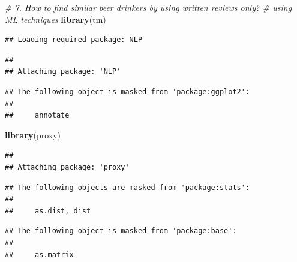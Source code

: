 \documentclass[
  a4paper,
]{article}
\newenvironment{Shaded}{\begin{snugshade}}{\end{snugshade}}
\newcommand{\AttributeTok}[1]{\textcolor[rgb]{0.13,0.29,0.53}{#1}}
\newcommand{\CommentTok}[1]{\textcolor[rgb]{0.56,0.35,0.01}{\textit{#1}}}
\newcommand{\ConstantTok}[1]{\textcolor[rgb]{0.56,0.35,0.01}{#1}}
\newcommand{\ControlFlowTok}[1]{\textcolor[rgb]{0.13,0.29,0.53}{\textbf{#1}}}
\newcommand{\FunctionTok}[1]{\textcolor[rgb]{0.13,0.29,0.53}{\textbf{#1}}}
\newcommand{\NormalTok}[1]{#1}
\newcommand{\OtherTok}[1]{\textcolor[rgb]{0.56,0.35,0.01}{#1}}
\newcommand{\SpecialCharTok}[1]{\textcolor[rgb]{0.81,0.36,0.00}{\textbf{#1}}}
\begin{document}
\begin{Shaded}
\begin{Highlighting}[]
\CommentTok{\# 7. How to find similar beer drinkers by using written reviews only?}
\CommentTok{\# using ML techniques}
\FunctionTok{library}\NormalTok{(tm)}
\end{Highlighting}
\end{Shaded}

\begin{verbatim}
## Loading required package: NLP
\end{verbatim}

\begin{verbatim}
## 
## Attaching package: 'NLP'
\end{verbatim}

\begin{verbatim}
## The following object is masked from 'package:ggplot2':
## 
##     annotate
\end{verbatim}

\begin{Shaded}
\begin{Highlighting}[]
\FunctionTok{library}\NormalTok{(proxy)}
\end{Highlighting}
\end{Shaded}

\begin{verbatim}
## 
## Attaching package: 'proxy'
\end{verbatim}

\begin{verbatim}
## The following objects are masked from 'package:stats':
## 
##     as.dist, dist
\end{verbatim}

\begin{verbatim}
## The following object is masked from 'package:base':
## 
##     as.matrix
\end{verbatim}

\begin{Shaded}
\end{Shaded}
\end{document}
